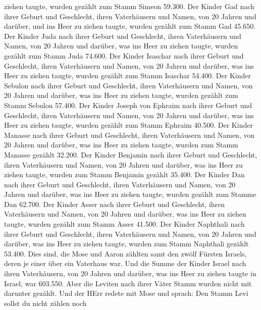 ziehen taugte,  wurden gezählt zum Stamm Simeon 59.300.
 Der Kinder Gad nach ihrer Geburt und Geschlecht, ihren
Vaterhäusern und Namen, von 20 Jahren und darüber, und ins Heer zu
ziehen taugte,  wurden gezählt zum Stamm Gad 45.650.
 Der Kinder Juda nach ihrer Geburt und Geschlecht, ihren
Vaterhäusern und Namen, von 20 Jahren und darüber, was ins Heer zu
ziehen taugte,  wurden gezählt zum Stamm Juda 74.600.
 Der Kinder Isaschar nach ihrer Geburt und Geschlecht,
ihren Vaterhäusern und Namen, von 20 Jahren und darüber, was ins Heer zu
ziehen taugte,  wurden gezählt zum Stamm Isaschar 54.400.
 Der Kinder Sebulon nach ihrer Geburt und Geschlecht, ihren
Vaterhäusern und Namen, von 20 Jahren und darüber, was ins Heer zu
ziehen taugte,  wurden gezählt zum Stamm Sebulon 57.400.
 Der Kinder Joseph von Ephraim nach ihrer Geburt und
Geschlecht, ihren Vaterhäusern und Namen, von 20 Jahren und darüber, was
ins Heer zu ziehen taugte,  wurden gezählt zum Stamm
Ephraim 40.500.  Der Kinder Manasse nach ihrer Geburt und
Geschlecht, ihren Vaterhäusern und Namen, von 20 Jahren und darüber, was
ins Heer zu ziehen taugte,  wurden zum Stamm Manasse
gezählt 32.200.  Der Kinder Benjamin nach ihrer Geburt und
Geschlecht, ihren Vaterhäusern und Namen, von 20 Jahren und darüber, was
ins Heer zu ziehen taugte,  wurden zum Stamm Benjamin
gezählt 35.400.  Der Kinder Dan nach ihrer Geburt und
Geschlecht, ihren Vaterhäusern und Namen, von 20 Jahren und darüber, was
ins Heer zu ziehen taugte,  wurden gezählt zum Stamme Dan
62.700.  Der Kinder Asser nach ihrer Geburt und Geschlecht,
ihren Vaterhäusern und Namen, von 20 Jahren und darüber, was ins Heer zu
ziehen taugte,  wurden gezählt zum Stamm Asser 41.500.
 Der Kinder Naphthali nach ihrer Geburt und Geschlecht,
ihren Vaterhäusern und Namen, von 20 Jahren und darüber, was ins Heer zu
ziehen taugte,  wurden zum Stamm Naphthali gezählt 53.400.
 Dies sind, die Mose und Aaron zählten samt den zwölf
Fürsten Israels, deren je einer über ein Vaterhaus war. 
Und die Summe der Kinder Israel nach ihren Vaterhäusern, von 20 Jahren
und darüber, was ins Heer zu ziehen taugte in Israel,  war
603.550.  Aber die Leviten nach ihrer Väter Stamm wurden
nicht mit darunter gezählt.  Und der HErr redete mit Mose
und sprach:  Den Stamm Levi sollst du nicht zählen noch
